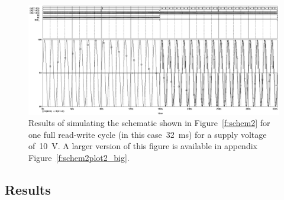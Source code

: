 \begin{figure}[H]
\centering
	\includegraphics[width=.8\textwidth]{img/shot/sim2_plot2.png}
	\parbox{.8\textwidth}{
	\caption[Part 2 Simulation Results 2]{Results of simulating the schematic
	shown in Figure~\ref{f:schem2} for one full read-write cycle (in this
	case~\SI{32}{\milli\second}) for a supply voltage of~\SI{10}{\volt}.  A
	larger version of this figure is available in appendix
	Figure~\ref{f:schem2plot2_big}.}
	\label{f:schem2plot2}}
\end{figure}

\subsection{Results}
